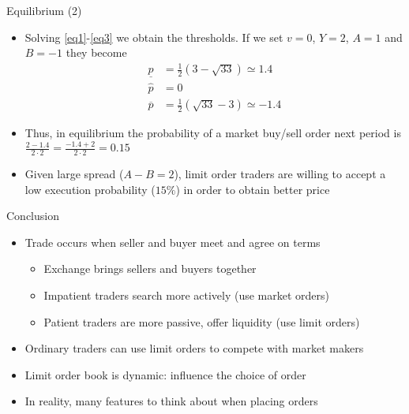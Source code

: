 \documentclass[english,10pt]{beamer}
\begin{document}
\begin{frame}[label=adverseorg]{Equilibrium (2)}
	\begin{itemize}
		\item Solving \eqref{eq1}-\eqref{eq3} we obtain the thresholds. If we set $v=0$, $Y=2$, $A=1$ and $B=-1$ they become
		\begin{align*}
		\underline{p} 	& = \frac{1}{2}(3-\sqrt{33}) \simeq 1.4 \\
		\hat{p} 	& = 0 \\
		\overline{p} 		& = \frac{1}{2}(\sqrt{33}-3) \simeq -1.4 
		\end{align*}
		\item Thus, in equilibrium the probability of a market buy/sell order next period is $\frac{2-1.4}{2\cdot 2}=\frac{-1.4+2}{2 \cdot 2}=0.15$
		\item Given  large spread ($A-B=2$), limit order traders are willing to accept a low execution probability ($15\%$) in order to obtain better price
	\end{itemize}
	\hyperlink{adverse}{}
\end{frame}


\begin{frame}{Conclusion}
	\begin{itemize}
		\item Trade occurs when seller and buyer meet and agree on terms
		\begin{itemize}
			\item Exchange brings sellers and buyers together
			\item Impatient traders search more actively (use market orders)
			\item Patient traders are more passive, offer liquidity (use limit orders)
		\end{itemize}
		\item Ordinary traders can use limit orders to compete with market makers
		\item Limit order book is dynamic: influence the choice of order
		\item In reality, many features to think about when placing orders
	\end{itemize}
\end{frame}
\end{document}
